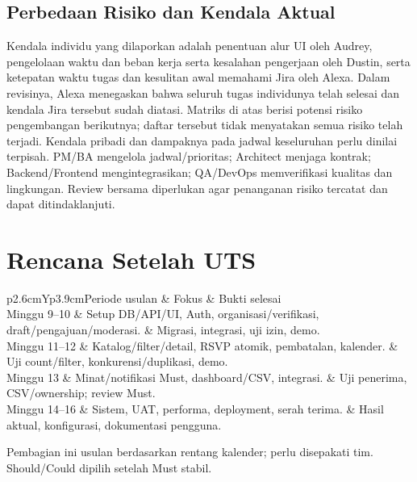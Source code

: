 \documentclass[11pt,a4paper]{article}
\newcommand{\tbl}[2]{\par\smallskip\noindent\begin{tabularx}{\linewidth}{#1}\toprule #2\bottomrule\end{tabularx}\par\smallskip}
\newcommand{\page}[1]{\clearpage\section{#1}}
\begin{document}
\subsection{Perbedaan Risiko dan Kendala Aktual}
Kendala individu yang dilaporkan adalah penentuan alur UI oleh Audrey, pengelolaan waktu dan beban kerja serta kesalahan pengerjaan oleh Dustin, serta ketepatan waktu tugas dan kesulitan awal memahami Jira oleh Alexa. Dalam revisinya, Alexa menegaskan bahwa seluruh tugas individunya telah selesai dan kendala Jira tersebut sudah diatasi. Matriks di atas berisi potensi risiko pengembangan berikutnya; daftar tersebut tidak menyatakan semua risiko telah terjadi. Kendala pribadi dan dampaknya pada jadwal keseluruhan perlu dinilai terpisah. \cite{audreyind,dustinind,alexaind}
PM/BA mengelola jadwal/prioritas; Architect menjaga kontrak; Backend/Frontend mengintegrasikan; QA/DevOps memverifikasi kualitas dan lingkungan. Review bersama diperlukan agar penanganan risiko tercatat dan dapat ditindaklanjuti.
\page{Rencana Setelah UTS}
\tbl{p{2.6cm}Yp{3.9cm}}{Periode usulan & Fokus & Bukti selesai\\\midrule
Minggu 9--10 & Setup DB/API/UI, Auth, organisasi/verifikasi, draft/pengajuan/moderasi. & Migrasi, integrasi, uji izin, demo.\\
Minggu 11--12 & Katalog/filter/detail, RSVP atomik, pembatalan, kalender. & Uji count/filter, konkurensi/duplikasi, demo.\\
Minggu 13 & Minat/notifikasi Must, dashboard/CSV, integrasi. & Uji penerima, CSV/ownership; review Must.\\
Minggu 14--16 & Sistem, UAT, performa, deployment, serah terima. & Hasil aktual, konfigurasi, dokumentasi pengguna.\\}
Pembagian ini usulan berdasarkan rentang kalender; perlu disepakati tim. Should/Could dipilih setelah Must stabil.
\end{document}
